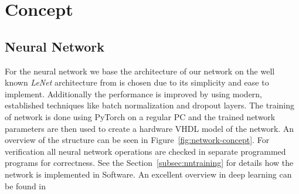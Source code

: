 \section{Concept}

\subsection{Neural Network}

For the neural network we base the architecture of our network on the well known \emph{LeNet} architecture from \cite{LeCun:1998aa} is chosen due to its simplicity and ease to implement. Additionally the performance is improved by using modern, established techniques like batch normalization \cite{Ioffe:2015aa} and dropout \cite{Srivastava:2014aa} layers. 
The training of network is done using PyTorch \cite{Paszke:2019aa} on a regular PC and the trained network parameters are then used to create a hardware VHDL model of the network. An overview of the structure can be seen in Figure~\ref{fig:network-concept}. For verification all neural network operations are checked in separate programmed programs for correctness. See the Section~\ref{subsec:nntraining} for details how the network is implemented in Software.
An excellent overview in deep learning can be found in \cite{Schmidhuber:2015aa}

